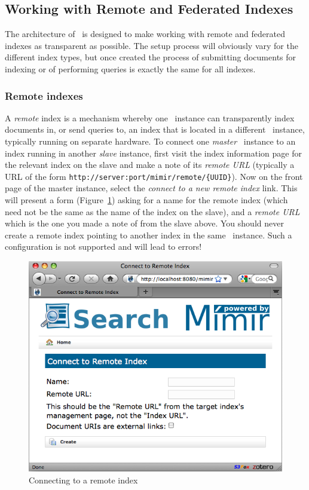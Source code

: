 \subsection{Working with Remote and Federated Indexes}

The architecture of \Mimir\ is designed to make working with remote and
federated indexes as transparent as possible.  The setup process will obviously
vary for the different index types, but once created the process of submitting
documents for indexing or of performing queries is exactly the same for all
indexes.

\subsubsection{Remote indexes}\label{sec:admin:remote-index}
A {\em remote} index is a mechanism whereby one \Mimir\ instance can
transparently index documents in, or send queries to, an index that is located
in a different \Mimir\ instance, typically running on separate hardware.  To
connect one {\em master} \Mimir\ instance to an index running in another {\em
slave} instance, first visit the index information page for the relevant
index on the slave and make a note of its {\em remote URL} (typically a URL of
the form \verb|http://server:port/mimir/remote/{UUID}|).  Now on the front page
of the master instance, select the {\em connect to a new remote index} link.
This will present a form (Figure~\ref{fig:connect-remote-index}) asking for a
name for the remote index (which need not be the same as the name of the index
on the slave), and a {\em remote URL} which is the one you made a note of from
the slave above. You should never create a remote index pointing to another
index in the same \Mimir\ instance. Such a configuration is not supported and
will lead to errors!
\begin{figure}[htb!]
\begin{center}
\includegraphics[scale=0.5]{img/connect-remote-index}
\end{center}
\caption{Connecting to a remote index}
\label{fig:connect-remote-index}
\end{figure}
%


